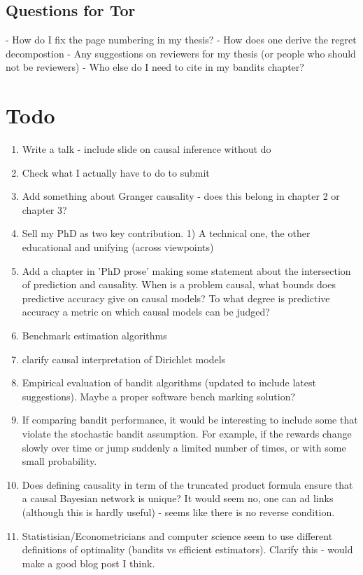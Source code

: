 


\section*{Questions for Tor}
- How do I fix the page numbering in my thesis?
- How does one derive the regret decompostion
- Any suggestions on reviewers for my thesis (or people who should not be reviewers)
- Who else do I need to cite in my bandits chapter?


\chapter*{Todo}
\begin{enumerate}
Clarify Cheng's Questions - is there a mechanical method to go from one framework to another, does it matter if variables are discrete or continuous. \todo{}

\item Write a talk - include slide on causal inference without do
\item Check what I actually have to do to submit
\item Add something about Granger causality - does this belong in chapter 2 or chapter 3?
\item Sell my PhD as two key contribution. 1) A technical one, the other educational and unifying (across viewpoints)
\item Add a chapter in 'PhD prose' making some statement about the intersection of prediction and causality. When is a problem causal, what bounds does predictive accuracy give on causal models? To what degree is predictive accuracy a metric on which causal models can be judged? 
\item Benchmark estimation algorithms
\item clarify causal interpretation of Dirichlet models
\item Empirical evaluation of bandit algorithms (updated to include latest suggestions). Maybe a proper software bench marking solution?
\item If comparing bandit performance, it would be interesting to include some that violate the stochastic bandit assumption. For example, if the rewards change slowly over time or jump suddenly a limited number of times, or with some small probability. 
\item Does defining causality in term of the truncated product formula ensure that a causal Bayesian network is unique? It would seem no, one can ad links (although this is hardly useful) - seems like there is no reverse condition. 
\item Statistisian/Econometricians and computer science seem to use different definitions of optimality (bandits vs efficient estimators). Clarify this - would make a good blog post I think. 
\end{enumerate}

